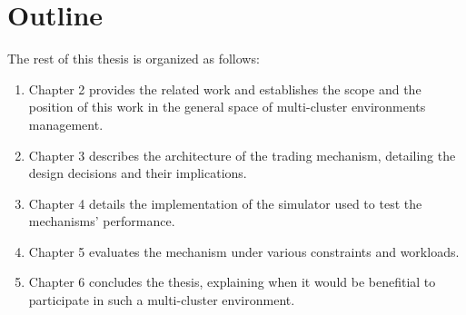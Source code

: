 \section{Outline}
The rest of this thesis is organized as follows:
\begin{enumerate}
  
  \item Chapter 2 provides the related work and establishes the scope and the
    position of this work in the general space of multi-cluster environments
    management.

  \item Chapter 3 describes the architecture of the trading mechanism,
    detailing the design decisions and their implications.  

  \item Chapter 4 details the implementation of the simulator used to test the
    mechanisms' performance.

  \item Chapter 5 evaluates the mechanism under various constraints and workloads. 

  \item Chapter 6 concludes the thesis, explaining when it would be benefitial
    to participate in such a multi-cluster environment.  

\end{enumerate}
